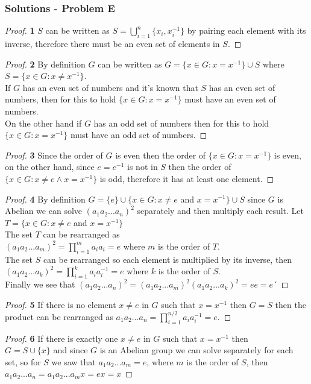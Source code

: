 \documentclass[11pt]{article}
\begin{document}
	\subsubsection*{Solutions - Problem E}		
		\begin{proof}{\textbf{1}}
			$S$ can be written as $S = \bigcup_{i=1}^n \{x_i, x_i^{-1}\}$ by pairing each element with its inverse, therefore there must be an even set of elements in $S$.
		\end{proof}
		\begin{proof}{\textbf{2}}
			By definition $G$ can be written as $G = \{x \in G: x=x^{-1}\} \cup S$ where $S = \{x \in G: x \neq x^{-1}\}$.\\
			If $G$ has an even set of numbers and it's known that $S$ has an even set of numbers, then for this to hold $\{x \in G: x=x^{-1}\}$ must have an even set of numbers.\\
			On the other hand if $G$ has an odd set of numbers then for this to hold $\{x \in G: x=x^{-1}\}$ must have an odd set of numbers.
		\end{proof}
		\begin{proof}{\textbf{3}}
			Since the order of $G$ is even then the order of $\{x \in G: x=x^{-1}\}$ is even, on the other hand, since $e=e^{-1}$ is not in $S$ then the order of $\{x \in G: x \neq e \land x=x^{-1}\}$ is odd, therefore it has at least one element.
		\end{proof}	
		\begin{proof}{\textbf{4}}
			By definition $G = \{e\} \cup \{x \in G:x \neq e $ and $ x=x^{-1}\} \cup S$ since $G$ is Abelian we can solve $(a_1a_2...a_n)^2$ separately and then multiply each result. Let $T=\{x \in G:x \neq e $ and $ x=x^{-1}\}$\\
			The set $T$ can be rearranged as \\$\displaystyle (a_1a_2...a_m)^2=\prod_{i=1}^{m} a_ia_i=e$ where $m$ is the order of $T$.\\
			The set $S$ can be rearranged so each element is multiplied by its inverse, then $\displaystyle (a_1a_2...a_k)^2=\prod_{i=1}^{k} a_ia_i^{-1}=e$ where $k$ is the order of $S$.\\
			Finally we see that $(a_1a_2...a_n)^2=(a_1a_2...a_m)^2(a_1a_2...a_k)^2=ee=e$´
		\end{proof}
		\begin{proof}{\textbf{5}}
			If there is no element $x \neq e$ in $G$ such that $x=x^{-1}$ then $G=S$ then the product can be rearranged as $\displaystyle a_1a_2...a_n=\prod_{i=1}^{n/2} a_ia_i^{-1}=e$.
		\end{proof}
		\begin{proof}{\textbf{6}}
			If there is exactly one $x \neq e$ in $G$ such that $x=x^{-1}$ then\\ $\displaystyle G=S \cup \{x\}$ and since $G$ is an Abelian group we can solve separately for each set, so for $S$ we saw that $a_1a_2...a_m=e$, where $m$ is the order of $S$, then $a_1a_2...a_n=a_1a_2...a_mx=ex=x$  
		\end{proof}
\cleardoublepage
\end{document}
